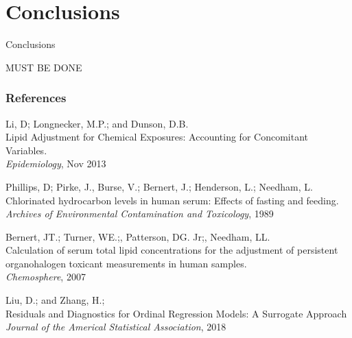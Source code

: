 \documentclass{beamer}
\begin{document}
\section{Conclusions}
\begin{frame}{Conclusions}

MUST BE DONE

\end{frame}


\begin{frame}
\frametitle{References}
\footnotesize{
	\begin{thebibliography}{99} %
		
		 Li, D; Longnecker, M.P.; and Dunson, D.B. \\
		\newblock Lipid Adjustment for Chemical Exposures: Accounting for Concomitant Variables.\\
		\newblock \emph{Epidemiology}, Nov 2013
		
		Phillips, D; Pirke, J., Burse, V.; Bernert, J.; Henderson, L.; Needham, L.\\
		\newblock Chlorinated hydrocarbon levels in human serum: Effects of fasting and feeding.\\
		\newblock \emph{Archives of Environmental Contamination and Toxicology}, 1989
		
		 Bernert, JT.; Turner, WE.;, Patterson, DG. Jr;, Needham, LL.\\
		\newblock Calculation of serum total lipid concentrations for the adjustment of persistent organohalogen toxicant measurements in human samples.\\
		\newblock \emph{Chemosphere}, 2007
		
		 Liu, D.; and Zhang, H.;\\
		\newblock Residuals and Diagnostics for Ordinal Regression Models: A Surrogate Approach\\
		\newblock \emph{Journal of the Americal Statistical Association}, 2018
		
	\end{thebibliography}
}
\end{frame}
\appendix
\end{document}
